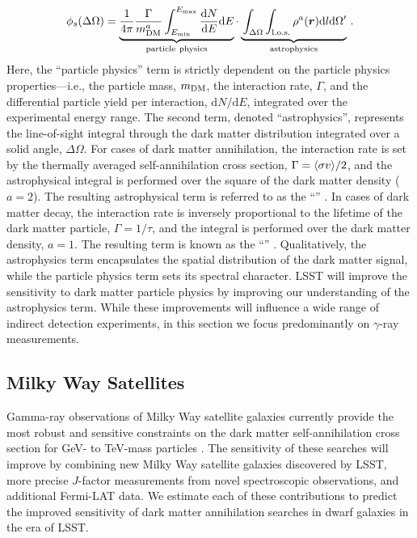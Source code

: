 \begin{equation}
   \phi_s(\Delta\Omega) =
    \underbrace{ \frac{1}{4\pi} \frac{\Gamma}{m_{\DM}^{a}}\int^{E_{\max}}_{E_{\min}}\frac{\text{d}N}{\text{d}E}\text{d}E}_{\rm particle\ physics}
    \cdot
    \underbrace{\vphantom{\int_{E_{\min}}} \int_{\Delta\Omega}\int_{\rm l.o.s.}\rho^{a}(\vect{r})\text{d}l\text{d}\Omega '}_{\rm astrophysics}\,.
    \label{eqn:indirect}
\end{equation}
\noindent Here, the ``particle physics'' term is strictly dependent on the particle physics properties---i.e., the particle mass, $m_{\mathrm{DM}}$,  the interaction rate, $\Gamma$, and the differential particle yield per interaction, $\text{d}N/\text{d}E$, integrated over the experimental energy range.
The second term, denoted ``astrophysics'', represents the line-of-sight integral through the dark matter distribution integrated over a solid angle, $\Delta\Omega$. 
For cases of dark matter annihilation, the interaction rate is set by the thermally averaged self-annihilation cross section, $\Gamma = \langle \sigma v \rangle/2$, and the astrophysical integral is performed over the square of the dark matter density ($a=2$). 
The resulting astrophysical term is referred to as the ``\Jfactor'' \citep[\eg,][]{1998APh.....9..137B}. 
In cases of dark matter decay, the interaction rate is inversely proportional to the lifetime of the dark matter particle, $\Gamma = 1/\tau$, and the integral is performed over the dark matter density, $a=1$. 
The resulting term is known as the ``\Dfactor'' \citep[\eg][]{1408.0002}.
Qualitatively, the astrophysics term encapsulates the spatial distribution of the dark matter signal, while the particle physics term sets its spectral character. 
LSST will improve the sensitivity to dark matter particle physics by improving our understanding of the astrophysics term.
While these improvements will influence a wide range of indirect detection experiments, in this section we focus predominantly on $\gamma$-ray measurements.


\subsection{Milky Way Satellites }

Gamma-ray observations of Milky Way satellite galaxies currently provide the most robust and sensitive constraints on the dark matter self-annihilation cross section for GeV- to TeV-mass particles \citep[\eg][]{Ackermann:2014, Geringer-Sameth:2015, Ackermann:2015}.
The sensitivity of these searches will improve by combining new Milky Way satellite galaxies discovered by LSST, more precise $J$-factor measurements from novel spectroscopic observations, and additional Fermi-LAT data. 
We estimate each of these contributions to predict the improved sensitivity of dark matter annihilation searches in dwarf galaxies in the era of LSST.

